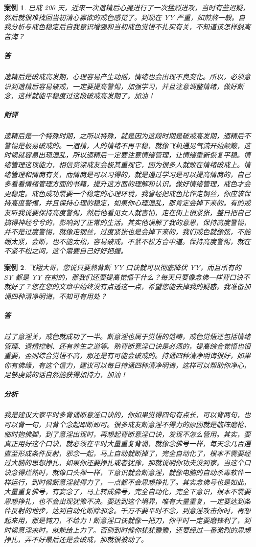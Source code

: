 \documentclass{ctexart}
\newtheorem{case}{案例}
\begin{document}
\begin{case}
    已戒 200 天，近来一次遗精后心魔进行了一次猛烈进攻，当时有些迟疑，然后就很难找回当初清心寡欲的戒色感觉了。到现在 YY 严重，如煎熬一般。自我分析与戒色稳定后自我意识增强和当初戒色觉悟不扎实有关，不知道该怎样脱离苦海？
    \subparagraph{答} 遗精后是破戒高发期，心理容易产生动摇，情绪也会出现不良变化。所以，必须意识到遗精后容易破戒，一定要提高警惕，加强学习，并且注意调整情绪，做好断念，这样就能平稳度过这段破戒高发期了。加油！
    \subparagraph{附评}遗精后是一个特殊时期，之所以特殊，就是因为这段时期是破戒高发期，遗精后不警惕是极易破戒的。一遗精，人的情绪不再平稳，就像飞机遇见气流开始颠簸，这时候就容易出现混乱，所以遗精后一定要注意情绪管理，让情绪重新恢复平稳。情绪管理这项能力，相信资深戒友会极其重视它，因为很多人就败在情绪破戒上。情绪管理和情商有关，而情商是可以习得的，就是通过学习是可以提高情商的，自己多看看情绪管理方面的书籍，提升这方面的理解和认识。做好情绪管理，戒色才会更稳定。戒色成功需要一个稳定的心理环境，我曾经把戒色比作走钢丝，你应该保持高度警惕，并且保持心理的稳定，如果你心理混乱，那肯定会掉下来的。有的戒友听我说要保持高度警惕，然后他看见女人就害怕，走在街上很紧张，整日把自己搞得神经兮兮的，影响到了正常的生活。其实他误解了我的意思，保持高度警惕，并不是过度警惕，就像走钢丝，过度紧张也是会掉下来的，我们戒色就像弦，不能绷太紧，会断，也不能太松，容易破戒。不紧不松方合中道。保持高度警惕，就在不紧不松之间，这个需要自己好好把握。
\end{case}

\begin{case}
    飞翔大哥，您说只要熟背断 YY 口诀就可以彻底降伏 YY，而且所有的 SY 都是 YY 在前的，那我们还要提高觉悟干什么？每天只要像念佛一样背口诀不就好了？您在您的文章中始终没有点透这一点，希望您能去掉我的疑惑。我准备加诵四种清净明诲，不知可有用处？
    \subparagraph{答} 过了意淫关，戒色就成功了一半。断意淫也属于觉悟的范畴，戒色觉悟还包括情绪管理、遗精控制、还有养生之道等。熟背断意淫口诀是必须的，提高综合觉悟也很重要，否则综合觉悟不高，那还是有可能会破戒的。持诵四种清净明诲很好，如果你有佛缘，有这个信力，建议可以每日持诵四种清净明诲，这样可以帮助你净心，足够虔诚的话自然能获得加持力，加油！
    \subparagraph{分析} 我是建议大家平时多背诵断意淫口诀的，你如果觉得四句有点长，可以背两句，也可以背一句，只背个念起即断即可。很多戒友断意淫不得力的原因就是临阵磨枪、临时抱佛脚，到了意淫出现时，再想起背断意淫口诀，发现不怎么管用。其实，要真正用好这个口诀，就必须在平时大量重复背诵，就像念佛号一样，每天念几百遍直至形成条件反射，邪念一起，马上自动就断掉了，完全自动化了，根本不需要经过大脑的思想挣扎，如果你还要挣扎或者犹豫，那就说明你功夫没到家。当这个口诀念得烂熟时，就像口头禅一样，下意识就会断意淫，就像电脑的自动杀毒软件一样运行，到时候断意淫就得力了，一点都不会思想挣扎了。其实念佛号也是如此，大量重复佛号，有妄念了，马上转成佛号，完全自动化，完全下意识，根本不需要思想挣扎，也不会出现犹豫不决。要达到这个境界，唯有大量重复，一定要达到条件反射的地步，达到自动化断除邪念。千万不要平时不念，到意淫攻击你时，再想起来用，那是钝刀，不给力！断意淫口诀就像一把刀，你平时一定要磨锋利了，到时候意淫来时，就能给上力了。否则到时候你犹犹豫豫，还要经过一番激烈的思想挣扎，弄不好最后还是会破戒，那就很被动了。
\end{case}
\end{document}

